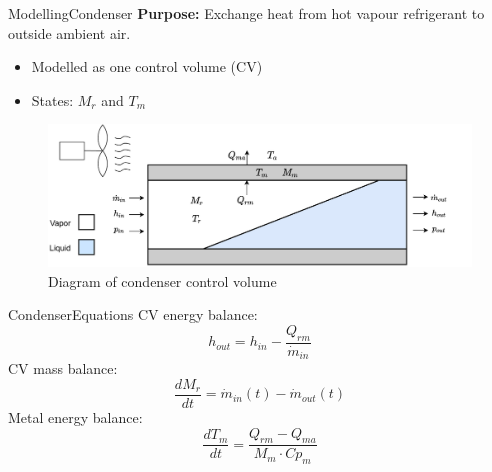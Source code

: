 \begin{frame}{Modelling}{Condenser}
	\textbf{Purpose:} Exchange heat from hot vapour refrigerant to outside ambient air.
	\begin{itemize}
		\item Modelled as one control volume (CV)
		\item States: $M_r$ and $T_m$
	\end{itemize}
	\begin{figure}[h!]
		\centering
		\includegraphics[width=1\textwidth]{../Graphics/Condenser.pdf}
		\caption{Diagram of condenser control volume}
		\label{fig:condenser_CV}
	\end{figure}
\end{frame}
\begin{frame}{Condenser}{Equations}
	CV energy balance:
	\begin{equation}
		h_{out} = h_{in} - \frac{Q_{rm}}{\dot{m}_{in}} \label{eq:Condenser_Enthalpy}
	\end{equation}
	CV mass balance:
	\begin{equation}
		\frac{dM_r}{dt} 	 = \dot{m}_{in}(t) - \dot{m}_{out}(t) \label{eq:Condenser_ChangeOfMass}
	\end{equation}
	Metal energy balance:
	\begin{equation}
		\frac{dT_m}{dt} 	 = \frac{Q_{rm} - Q_{ma}}{M_m \cdot Cp_m} \label{eq:Condenser_ChangeOfTemperature}
	\end{equation}
\end{frame}





